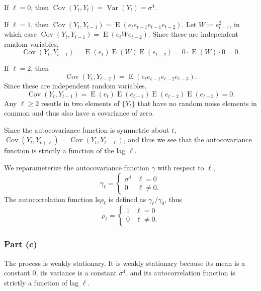 \documentclass[
]{article}
\begin{document}
If \(\ell=0\), then
\(\operatorname{Cov}(Y_t,Y_t) = \operatorname{Var}(Y_t) = \sigma^4\).

If \(\ell=1\), then
\(\operatorname{Cov}(Y_t,Y_{t-1}) = \operatorname{E}(e_t e_{t-1} e_{t-1} e_{t-2})\).
Let \(W \coloneqq e_{t-1}^2\), in which case
\(\operatorname{Cov}(Y_t,Y_{t-1}) = \operatorname{E}(e_t W e_{t-2})\).
Since these are independent random variables, \[
   \operatorname{Cov}(Y_t,Y_{t-1}) = \operatorname{E}(e_t) \operatorname{E}(W) \operatorname{E}(e_{t-2}) = 0 \cdot \operatorname{E}(W) \cdot 0 = 0.
\]

If \(\ell=2\), then \[
   \operatorname{Cov}(Y_t,Y_{t-2}) = \operatorname{E}(e_t e_{t-1} e_{t-2} e_{t-3}).
\] Since these are independent random variables, \[
   \operatorname{Cov}(Y_t,Y_{t-1}) = \operatorname{E}(e_t) \operatorname{E}(e_{t-1}) \operatorname{E}(e_{t-2}) \operatorname{E}(e_{t-3}) = 0.
\] Any \(\ell \geq 2\) resutls in two elements of \(\{Y_t\}\) that have
no random noise elements in common and thus also have a covariance of
zero.

Since the autocovariance function is symmetric about \(t\),
\(\operatorname{Cov}(Y_t,Y_{t+\ell}) = \operatorname{Cov}(Y_t,Y_{t-\ell})\),
and thus we see that the autocovariance function is strictly a function
of the lag \(\ell\).

We reparameterize the autocovariance function \(\gamma\) with respect to
\(\ell\), \[
   \gamma_\ell =
   \begin{cases}
      \sigma^4    & \ell = 0\\
      0           & \ell \neq 0.
   \end{cases}
\] The autocorrelation function ls\(\rho_\ell\) is defined as
\(\gamma_\ell / \gamma_0\), thus \[
   \rho_\ell =
   \begin{cases}
      1    & \ell = 0\\
      0    & \ell \neq 0.
   \end{cases}
\]

\hypertarget{part-c-1}{%
\subsubsection{Part (c)}\label{part-c-1}}


The process is weakly stationary. It is weakly stationary because its
mean is a constant \(0\), its variance is a constant \(\sigma^4\), and
its autocorrelation function is strictly a function of lag \(\ell\).
\end{document}
